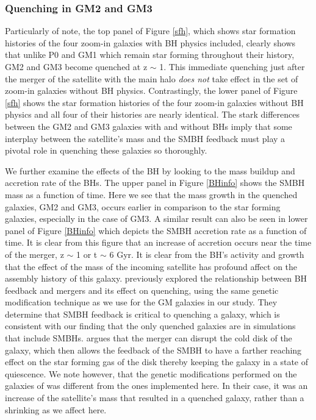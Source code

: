 \documentclass[]{emulateapj}
\begin{document}
\subsubsection{Quenching in GM2 and GM3}
Particularly of note, the top panel of Figure \ref{sfh}, which shows star formation histories of the four zoom-in galaxies with BH physics included, clearly shows that unlike P0 and GM1 which remain star forming throughout their history, GM2 and GM3 become quenched at z $\sim$ 1. This immediate quenching just after the merger of the satellite with the main halo \textit{does not} take effect in the set of zoom-in galaxies without BH physics. Contrastingly, the lower panel of Figure \ref{sfh} shows the star formation histories of the four zoom-in galaxies without BH physics and all four of their histories are nearly identical. The stark differences between the GM2 and GM3 galaxies with and without BHs imply that some interplay between the satellite's mass and the SMBH feedback must play a pivotal role in quenching these galaxies so thoroughly. 

We further examine the effects of the BH by looking to the mass buildup and accretion rate of the BHs. The upper panel in Figure \ref{BHinfo} shows the SMBH mass as a function of time. Here we see that the mass growth in the quenched galaxies, GM2 and GM3, occurs earlier in comparison to the star forming galaxies, especially in the case of GM3. A similar result can also be seen in lower panel of Figure \ref{BHinfo} which depicts the SMBH accretion rate as a function of time. It is clear from this figure that an increase of accretion occurs near the time of the merger, z $\sim$ 1 or t $\sim$ 6 Gyr. It is clear from the BH's activity and growth that the effect of the mass of the incoming satellite has profound affect on the assembly history of this galaxy. \cite{Pontzen2016} previously explored the relationship between BH feedback and mergers and its effect on quenching, using the same genetic modification technique as we use for the GM galaxies in our study. They determine that SMBH feedback is critical to quenching a galaxy, which is consistent with our finding that the only quenched galaxies are in simulations that include SMBHs. \cite{Pontzen2016} argues that the merger can disrupt the cold disk of the galaxy, which then allows the feedback of the SMBH to have a farther reaching effect on the star forming gas of the disk thereby keeping the galaxy in a state of quiescence. We note however, that the genetic modifications performed on the galaxies of \citep{Pontzen2016} was different from the ones implemented here. In their case, it was an increase of the satellite's mass that resulted in a quenched galaxy, rather than a shrinking as we affect here.
\end{document}
